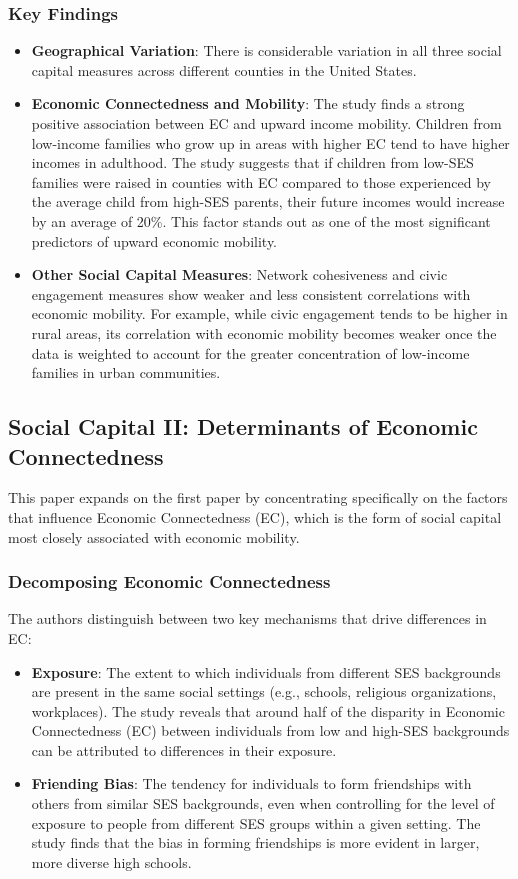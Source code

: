 \documentclass[9 pt]{article} %
\begin{document}
\subsubsection*{Key Findings}
\begin{itemize}
    \item \textbf{Geographical Variation}: There is considerable variation in all three social capital measures across different counties in the United States.
    \item \textbf{Economic Connectedness and Mobility}: The study finds a strong positive association between EC and upward income mobility. Children from low-income families who grow up in areas with higher EC tend to have higher incomes in adulthood. The study suggests that if children from low-SES families were raised in counties with EC compared to those experienced by the average child from high-SES parents, their future incomes would increase by an average of 20\%. This factor stands out as one of the most significant predictors of upward economic mobility.
    \item \textbf{Other Social Capital Measures}: Network cohesiveness and civic engagement measures show weaker and less consistent correlations with economic mobility. For example, while civic engagement tends to be higher in rural areas, its correlation with economic mobility becomes weaker once the data is weighted to account for the greater concentration of low-income families in urban communities.
\end{itemize}

\subsection{Social Capital II: Determinants of Economic Connectedness}
This paper expands on the first paper by concentrating specifically on the factors that influence Economic Connectedness (EC), which is the form of social capital most closely associated with economic mobility. \cite{chetty2022social2}

\subsubsection*{Decomposing Economic Connectedness}
The authors distinguish between two key mechanisms that drive differences in EC:

\begin{itemize}
    \item \textbf{Exposure}: The extent to which individuals from different SES backgrounds are present in the same social settings (e.g., schools, religious organizations, workplaces). The study reveals that around half of the disparity in Economic Connectedness (EC) between individuals from low and high-SES backgrounds can be attributed to differences in their exposure.
    \item \textbf{Friending Bias}: The tendency for individuals to form friendships with others from similar SES backgrounds, even when controlling for the level of exposure to people from different SES groups within a given setting. The study finds that the bias in forming friendships is more evident in larger, more diverse high schools.
\end{itemize}
\end{document}
